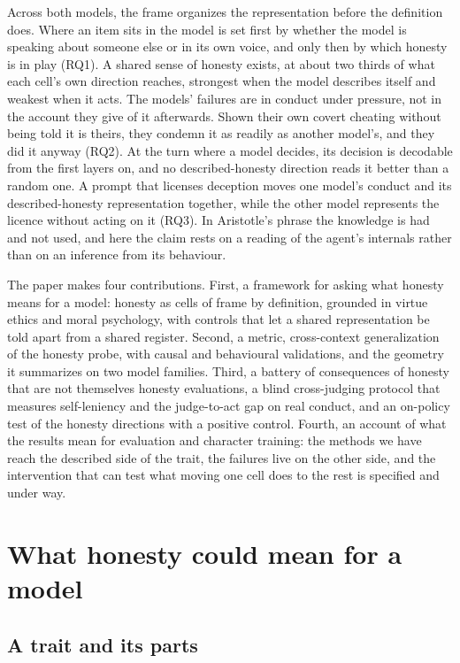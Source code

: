 \documentclass[11pt]{article}
\begin{document}
Across both models, the frame organizes the representation before the definition does. Where an item sits in the
model is set first by whether the model is speaking about someone else or in its own voice, and only then by which
honesty is in play (RQ1). A shared sense of honesty exists, at about two thirds of what each cell's own direction
reaches, strongest when the model describes itself and weakest when it acts. The models' failures are in conduct under
pressure, not in the account they give of it afterwards. Shown their own covert cheating without being told it is
theirs, they condemn it as readily as another model's, and they did it anyway (RQ2). At the turn where a model
decides, its decision is decodable from the first layers on, and no described-honesty direction reads it better than
a random one. A prompt that licenses deception moves one model's conduct and its described-honesty representation
together, while the other model represents the licence without acting on it (RQ3). In Aristotle's phrase the
knowledge is had and not used, and here the claim rests on a reading of the agent's internals rather than on an
inference from its behaviour.

The paper makes four contributions. First, a framework for asking what honesty means for a model: honesty as cells of
frame by definition, grounded in virtue ethics and moral psychology, with controls that let a shared representation
be told apart from a shared register. Second, a metric, cross-context generalization of the honesty probe, with
causal and behavioural validations, and the geometry it summarizes on two model families. Third, a battery of
consequences of honesty that are not themselves honesty evaluations, a blind cross-judging protocol that measures
self-leniency and the judge-to-act gap on real conduct, and an on-policy test of the honesty directions with a
positive control. Fourth, an account of what the results mean for evaluation and character training: the methods we
have reach the described side of the trait, the failures live on the other side, and the intervention that can test
what moving one cell does to the rest is specified and under way.

\section{What honesty could mean for a model}

\subsection{A trait and its parts}
\end{document}
